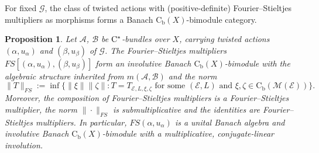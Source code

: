 \documentclass[11 pt, leqno]{amsart}
\numberwithin{equation}{section}
\theoremstyle{plain}
\newtheorem {prop}[thm] {Proposition}
\theoremstyle{definition}
\newcommand*{\contb}{\mathrm{C_b}}%
\newcommand{\B}{\mathcal B}
\newcommand{\M}{\mathcal M}
\newcommand{\m}{m}
\newcommand{\G}{\mathcal G} %
\newcommand{\EE}{\mathcal E}
\newcommand{\A}{\mathcal A}
\newcommand{\cst}{\ifmmode\mathrm{C}^*\else{$\mathrm{C}^*$}\fi}
\begin{document}

For fixed $\G$, the class of twisted actions with (positive-definite) Fourier--Stieltjes multipliers as morphisms forms a Banach $\contb(X)$-bimodule category. 

\begin{prop}\label{prop:BanachNormFS} 
Let $\A$, $\B$ be $\cst$-bundles over $X$, carrying twisted actions $(\alpha,u_\alpha)$ and $(\beta,u_\beta)$ of $\G$.
The Fourier--Stieltjes multipliers $FS[(\alpha,u_{\alpha}),(\beta,u_{\beta})]$ form an involutive Banach $\contb(X)$-bimodule with the algebraic structure inherited from $\m(\A, \B)$ and the norm 
\begin{equation}\label{eq:norm_Fourier-Stieltjes}
    \|T\|_{FS} := \inf\{\|\xi \|\|\zeta \|: T=T_{\EE,L,\xi,\zeta} \text{ for some  }(\EE, L)\text{ and }\xi,\zeta\in \contb(\M(\EE)) \} .
\end{equation}
Moreover, the composition of Fourier--Stieltjes multipliers is a Fourier--Stieltjes multiplier, the norm $\|\cdot\|_{FS}$ is submultiplicative and the identities are Fourier--Stieltjes multipliers.
In particular, $FS(\alpha,u_{\alpha})$ is a unital Banach algebra and involutive Banach $\contb(X)$-bimodule with a multiplicative, conjugate-linear involution. 
\end{prop}
\end{document}
